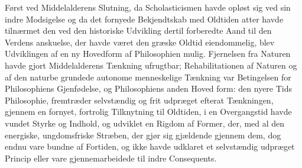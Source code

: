 \documentclass[12pt,a4paper]{book}
\begin{document}
Først ved Middelalderens Slutning, da Scholasticismen
havde opløst sig ved sin indre Modsigelse og da det fornyede
Bekjendtskab med Oldtiden atter havde tilnærmet den ved den
historiske Udvikling dertil forberedte Aand til den Verdens\-%
anskuelse, der havde været den græske Oldtid eiendommelig,
blev Udviklingen af en ny Hovedform af Philosophien mulig.
Fjernelsen fra Naturen havde gjort Middelalderens Tænkning
ufrugtbar; Rehabilitationen af Naturen og af den naturbe\-%
grundede autonome menneskelige Tænkning var Betingelsen
for Philosophiens Gjenfødelse, og Philosophiens anden Hoved\-%
form: den nyere Tids Philosophie, fremtræder selvstændig og
frit udpræget efterat Tænkningen, gjennem en fornyet, fortrolig
Tilknytning til Oldtiden, i en Overgangstid havde vundet Styrke
og Indhold, og udviklet en Rigdom af Former, der, med al
den energiske, ungdomsfriske Stræben, der gjør sig gjældende
gjennem dem, dog endnu vare bundne af Fortiden, og ikke
havde udklaret et selvstændig udpræget Princip eller vare
gjennemarbeidede til indre Consequents.
\end{document}
